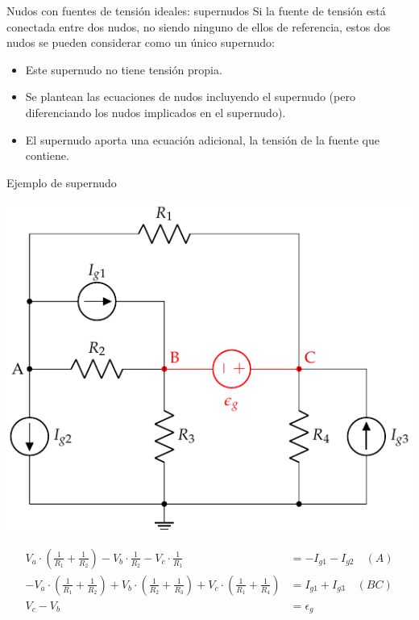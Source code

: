 \documentclass[aspectratio=169, usenames,svgnames,dvipsnames]{beamer}
\begin{document}
\begin{frame}[label={sec:org3153112}]{Nudos con fuentes de tensión ideales: supernudos}
Si la fuente de tensión está conectada entre dos nudos, no siendo ninguno de ellos de referencia, estos dos nudos se pueden considerar como un único \alert{supernudo}:
\begin{itemize}
\item Este supernudo no tiene tensión propia.
\item Se plantean las ecuaciones de nudos incluyendo el supernudo (pero diferenciando los nudos implicados en el supernudo).
\item El supernudo aporta una ecuación adicional, la tensión de la fuente que contiene.
\end{itemize}
\end{frame}


\begin{frame}[label={sec:org3476204}]{Ejemplo de supernudo}
\begin{center}
\includegraphics[height=0.5\textheight]{../figs/supernudo.pdf}
\end{center}

\begin{align*}
  V_a\cdot (\frac{1}{R_1} + \frac{1}{R_2}) - V_b \cdot \frac{1}{R_2} - V_c \cdot \frac{1}{R_1} &= -I_{g1} - I_{g2} \quad (A)\\
  - V_a\cdot (\frac{1}{R_1} + \frac{1}{R_2}) + V_b \cdot (\frac{1}{R_2} + \frac{1}{R_3}) + V_c \cdot (\frac{1}{R_1} + \frac{1}{R_4}) &= I_{g1} + I_{g3} \quad (BC)\\
  V_c - V_b &= \epsilon_g
\end{align*}
\end{frame}
\end{document}
